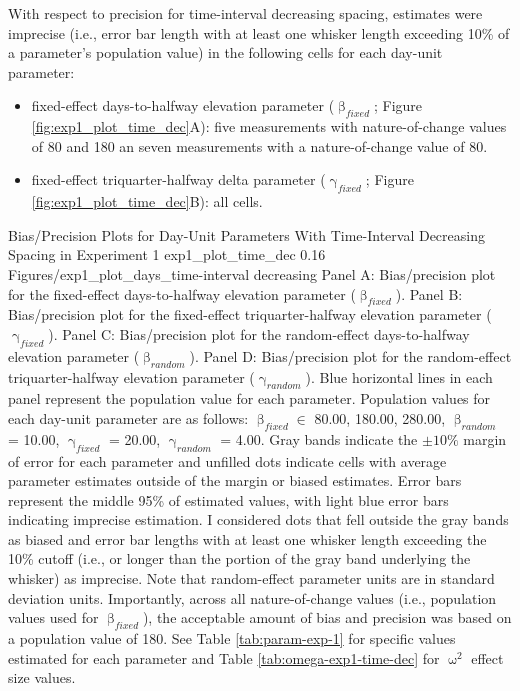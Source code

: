 \documentclass[
12pt, %
twoside,
english]{guelphthesis}
\begin{document}
With respect to precision for time-interval decreasing spacing, estimates were imprecise (i.e., error bar length with at least one whisker length exceeding 10\% of a parameter's population value) in the following cells for each day-unit parameter:
\begin{itemize}
\tightlist
\item
  fixed-effect days-to-halfway elevation parameter (\(\upbeta_{fixed}\); Figure \ref{fig:exp1_plot_time_dec}A): five measurements with nature-of-change values of 80 and 180 an seven measurements with a nature-of-change value of 80.
\item
  fixed-effect triquarter-halfway delta parameter (\(\upgamma_{fixed}\); Figure \ref{fig:exp1_plot_time_dec}B): all cells.
\end{itemize}
\begin{apaFigure}
[portrait]
[samepage]
[-0.2cm] %
{Bias/Precision Plots for Day-Unit Parameters With Time-Interval Decreasing Spacing in Experiment 1} 
{exp1_plot_time_dec}
{0.16} %
{Figures/exp1_plot_days_time-interval decreasing} %
{Panel A: Bias/precision plot for the fixed-effect days-to-halfway elevation parameter ($\upbeta_{fixed}$). Panel B: Bias/precision plot for the fixed-effect triquarter-halfway elevation parameter ($\upgamma_{fixed}$). Panel C: Bias/precision plot for the random-effect days-to-halfway elevation parameter ($\upbeta_{random}$). Panel D: Bias/precision plot for the random-effect triquarter-halfway elevation parameter ($\upgamma_{random}$). Blue horizontal lines in each panel represent the population value for each parameter. Population values for each day-unit parameter are as follows: $\upbeta_{fixed} \in$ {80.00, 180.00, 280.00}, $\upbeta_{random}$ = 10.00, $\upgamma_{fixed}$ = 20.00, $\upgamma_{random}$ = 4.00. Gray bands indicate the $\pm 10\%$ margin of error for each parameter and unfilled dots indicate cells with average parameter estimates outside of the margin or biased estimates. Error bars represent the middle 95\% of estimated values, with light blue error bars indicating imprecise estimation. I considered dots that fell outside the gray bands as biased and error bar lengths with at least one whisker length exceeding the 10\% cutoff (i.e., or longer than the portion of the gray band underlying the whisker) as imprecise. Note that random-effect parameter units are in standard deviation units. Importantly, across all nature-of-change values (i.e., population values used for $\upbeta_{fixed}$), the acceptable amount of bias and precision was based on a population value of 180. See Table \ref{tab:param-exp-1} for specific values estimated for each parameter and Table \ref{tab:omega-exp1-time-dec} for $\upomega^2$ effect size values.}
\end{apaFigure}
\end{document}
